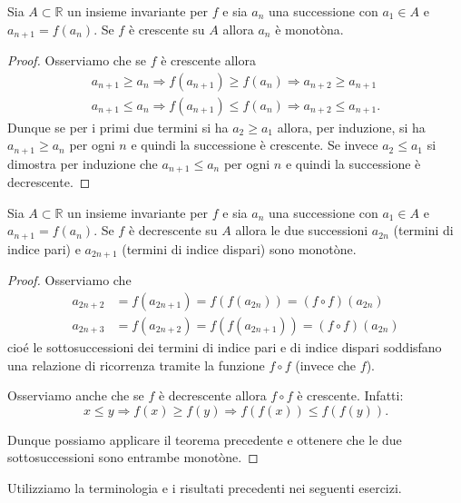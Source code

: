 \documentclass[italian,a4paper]{scrartcl}
\newcommand{\RR}{{\mathbb R}}
\begin{document}
\begin{theorem}
  Sia $A\subset \RR$ un insieme invariante per $f$ e sia $a_n$ una successione
  con $a_1\in A$ e $a_{n+1} = f(a_n)$. Se $f$ è crescente
  su $A$ allora $a_n$
  è monotòna.
\end{theorem}
\begin{proof}
  Osserviamo che se $f$ è crescente allora
  \begin{align*}
    a_{n+1} \ge a_n \Rightarrow f(a_{n+1}) \ge f(a_n) \Rightarrow
    a_{n+2} \ge a_{n+1}\\
    a_{n+1} \le a_n \Rightarrow f(a_{n+1}) \le f(a_n) \Rightarrow a_{n+2} \le a_{n+1}.
  \end{align*}
  Dunque se per i primi due termini si ha $a_2 \ge a_1$ allora, per
  induzione, si ha $a_{n+1} \ge a_n$ per ogni $n$ e quindi la
  successione è crescente. Se invece $a_2 \le a_1$ si dimostra per
  induzione che $a_{n+1} \le a_n$ per ogni $n$ e quindi la successione
  è decrescente.
\end{proof}

\begin{theorem}\label{th_decr}
  Sia $A\subset \RR$ un insieme invariante per $f$ e sia $a_n$ una successione
  con $a_1\in A$ e $a_{n+1} = f(a_n)$. Se $f$ è decrescente
  su $A$
  allora le due successioni $a_{2n}$ (termini di indice pari) e
  $a_{2n+1}$ (termini di indice dispari) sono monotòne.
\end{theorem}
\begin{proof}
  Osserviamo che
  \begin{align*}
    a_{2n+2} &= f(a_{2n+1}) = f(f(a_{2n})) = (f\circ f)(a_{2n})\\
    a_{2n+3} &= f(a_{2n+2}) = f(f(a_{2n+1})) = (f\circ f)(a_{2n})
  \end{align*}
cioé le sottosuccessioni dei termini di indice pari e di indice
dispari soddisfano una relazione di ricorrenza tramite la funzione
$f\circ f$ (invece che $f$).

Osserviamo anche che se $f$ è decrescente allora $f\circ f$ è
crescente. Infatti:
\[
x \le y \Rightarrow f(x) \ge f(y) \Rightarrow f(f(x)) \le f(f(y)).
\]

Dunque possiamo applicare il teorema precedente e ottenere che le due
sottosuccessioni sono entrambe monotòne.
\end{proof}

Utilizziamo la terminologia e i risultati precedenti nei seguenti
esercizi.
\end{document}
